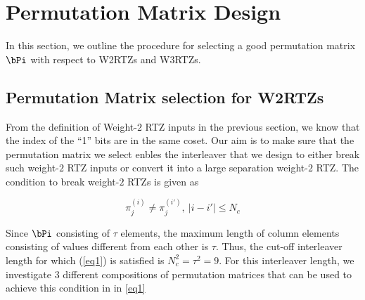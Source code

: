 \section{Permutation Matrix Design}
In this section, we outline the procedure for selecting a good permutation matrix $\bPi$ with respect to W2RTZs and W3RTZs.

\subsection{Permutation Matrix selection for W2RTZs}
From the definition of Weight-$2$ RTZ inputs in the previous section, we know that the index of the ``1'' bits are in the same coset. Our aim is to make sure that the permutation matrix we select enbles the interleaver that we design to either break such weight-$2$ RTZ inputs or convert it into a large separation weight-$2$ RTZ. 
The condition to break weight-$2$ RTZs is given as

\begin{equation}
\pi_{j}^{(i)} \neq \pi_{j}^{(i')},~|i-i'| \leq N_c
\label{eq1}
\end{equation}

Since $\bPi$ consisting of $\tau$ elements, the maximum length of column elements consisting of values different from each other is $\tau$. Thus, the cut-off interleaver length for which (\ref{eq1}) is satisfied is $N_c^2=\tau^2=9$.
For this interleaver length, we investigate 3 different compositions of permutation matrices that can be used to achieve this condition in in \ref{eq1}

